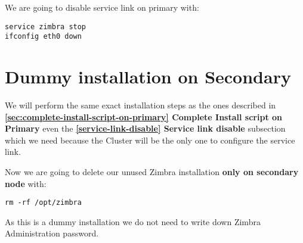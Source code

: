 We are going to disable service link on primary with:
\begin{verbatim}
service zimbra stop
ifconfig eth0 down
\end{verbatim}

\section {Dummy installation on Secondary}
We will perform the same exact installation steps as the ones described in 
\textbf{\ref{sec:complete-install-script-on-primary} Complete Install script on Primary} even the \textbf{\ref{service-link-disable} Service link disable} subsection which we need because the Cluster will be the only one to configure the service link.

Now we are going to delete our unused Zimbra installation \textbf{only on secondary node} with:
\begin{verbatim}
rm -rf /opt/zimbra
\end{verbatim}

As this is a dummy installation we do not need to write down Zimbra Administration password.